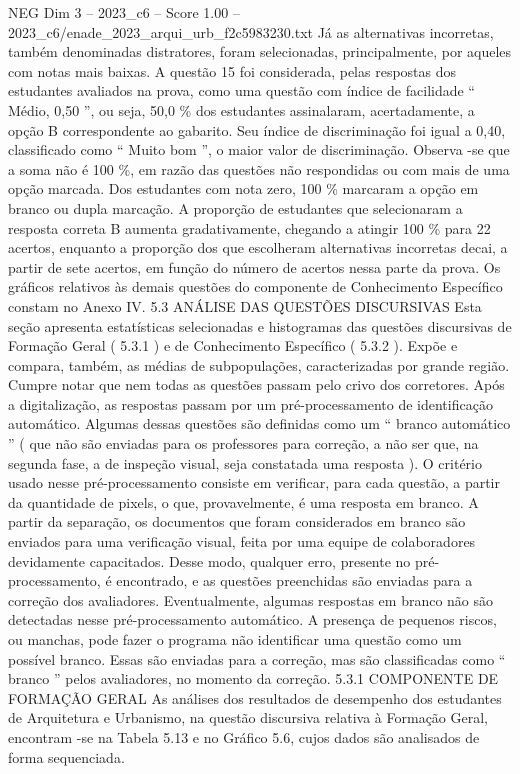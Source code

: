 \begin{textsample}{NEG Dim 3 – 2023\_c6 – Score 1.00 – 2023\_c6/enade\_2023\_arqui\_urb\_f2c5983230.txt}
Já as alternativas incorretas, também denominadas distratores, foram selecionadas, principalmente, por aqueles com notas mais baixas.
A questão 15 foi considerada, pelas respostas dos estudantes avaliados na prova, como uma questão com índice de facilidade “ Médio, 0,50 ”, ou seja, 50,0 \% dos estudantes assinalaram, acertadamente, a opção B correspondente ao gabarito.
Seu índice de discriminação foi igual a 0,40, classificado como “ Muito bom ”, o maior valor de discriminação.
Observa -se que a soma não é 100 \%, em razão das questões não respondidas ou com mais de uma opção marcada.
Dos estudantes com nota zero, 100 \% marcaram a opção em branco ou dupla marcação.
A proporção de estudantes que selecionaram a resposta correta B aumenta gradativamente, chegando a atingir 100 \% para 22 acertos, enquanto a proporção dos que escolheram alternativas incorretas decai, a partir de sete acertos, em função do número de acertos nessa parte da prova.
Os gráficos relativos às demais questões do componente de Conhecimento Específico constam no Anexo IV. 5.3 ANÁLISE DAS QUESTÕES DISCURSIVAS Esta seção apresenta estatísticas selecionadas e histogramas das questões discursivas de Formação Geral ( 5.3.1 ) e de Conhecimento Específico ( 5.3.2 ).
Expõe e compara, também, as médias de subpopulações, caracterizadas por grande região.
Cumpre notar que nem todas as questões passam pelo crivo dos corretores.
Após a digitalização, as respostas passam por um pré-processamento de identificação automático.
Algumas dessas questões são definidas como um “ branco automático ” ( que não são enviadas para os professores para correção, a não ser que, na segunda fase, a de inspeção visual, seja constatada uma resposta ).
O critério usado nesse pré-processamento consiste em verificar, para cada questão, a partir da quantidade de pixels, o que, provavelmente, é uma resposta em branco.
A partir da separação, os documentos que foram considerados em branco são enviados para uma verificação visual, feita por uma equipe de colaboradores devidamente capacitados.
Desse modo, qualquer erro, presente no pré-processamento, é encontrado, e as questões preenchidas são enviadas para a correção dos avaliadores.
Eventualmente, algumas respostas em branco não são detectadas nesse pré-processamento automático.
A presença de pequenos riscos, ou manchas, pode fazer o programa não identificar uma questão como um possível branco.
Essas são enviadas para a correção, mas são classificadas como “ branco ” pelos avaliadores, no momento da correção. 5.3.1 COMPONENTE DE FORMAÇÃO GERAL As análises dos resultados de desempenho dos estudantes de Arquitetura e Urbanismo, na questão discursiva relativa à Formação Geral, encontram -se na Tabela 5.13 e no Gráfico 5.6, cujos dados são analisados de forma sequenciada.

\end{textsample}
